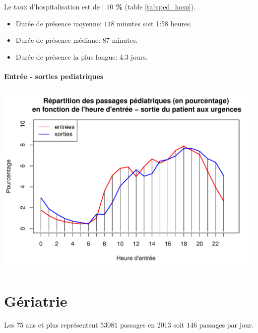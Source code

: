 \documentclass[12pt,english,french,twoside]{book}\usepackage[]{graphicx}\usepackage[]{color}
\makeatletter
\def\maxwidth{ %
  \ifdim\Gin@nat@width>\linewidth
    \linewidth
  \else
    \Gin@nat@width
  \fi
}
\newenvironment{knitrout}{}{} %
\makeatother
\begin{document}
Le taux d'hospitalisation est de : \textbf{$10$ \%} (table \ref{tab:ped_hosp}).





\begin{itemize}
  \item Durée de présence moyenne: $118$ minutes soit 1:58 heures.
  \item Durée de présence médiane: $87$ minutes.
  \item Durée de présence la plus longue: $4.3$ jours.
\end{itemize}

\subsubsection*{Entrée - sorties pediatriques}

\begin{knitrout}
\color{fgcolor}
\includegraphics[width=\maxwidth]{figure/es_pediatriques} 

\end{knitrout}



\chapter{Gériatrie}


\label{chap_geriatrie}




Les 75 ans et plus représentent $53 081$ passages en 2013 soit $146$ passages par jour.
\end{document}
